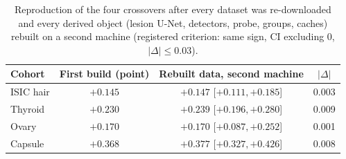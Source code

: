 \begin{table}[H]\centering\small
\caption{Reproduction of the four crossovers after every dataset was re-downloaded and every derived object (lesion U-Net, detectors, probe, groups, caches) rebuilt on a second machine (registered criterion: same sign, CI excluding 0, $|\Delta|\le0.03$).}\label{tab:rebuild}
\begin{tabular}{lccc}\toprule
Cohort & First build (point) & Rebuilt data, second machine & $|\Delta|$ \\\midrule
ISIC hair & $+0.145$ & $+0.147$ [$+0.111, +0.185$] & 0.003 \\
Thyroid & $+0.230$ & $+0.239$ [$+0.196, +0.280$] & 0.009 \\
Ovary & $+0.170$ & $+0.170$ [$+0.087, +0.252$] & 0.001 \\
Capsule & $+0.368$ & $+0.377$ [$+0.327, +0.426$] & 0.008 \\
\bottomrule\end{tabular}
\end{table}
